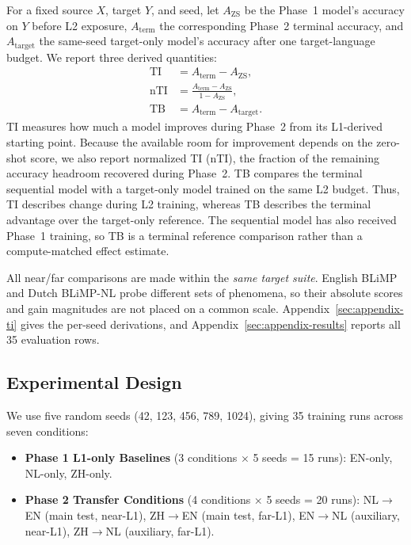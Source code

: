 \documentclass[11pt]{article}
\begin{document}
For a fixed source $X$, target $Y$, and seed, let $A_{\mathrm{ZS}}$ be the Phase~1 model's accuracy on $Y$ before L2 exposure, $A_{\mathrm{term}}$ the corresponding Phase~2 terminal accuracy, and $A_{\mathrm{target}}$ the same-seed target-only model's accuracy after one target-language budget. We report three derived quantities:
\begin{equation}
\begin{aligned}
\mathrm{TI}  &= A_{\mathrm{term}}-A_{\mathrm{ZS}},\\
\mathrm{nTI}&= \frac{A_{\mathrm{term}}-A_{\mathrm{ZS}}}{1-A_{\mathrm{ZS}}},\\
\mathrm{TB} &= A_{\mathrm{term}}-A_{\mathrm{target}}.
\end{aligned}
\label{eq:metrics}
\end{equation}
TI measures how much a model improves during Phase~2 from its L1-derived starting point. Because the available room for improvement depends on the zero-shot score, we also report normalized TI (nTI), the fraction of the remaining accuracy headroom recovered during Phase~2. TB compares the terminal sequential model with a target-only model trained on the same L2 budget. Thus, TI describes change during L2 training, whereas TB describes the terminal advantage over the target-only reference. The sequential model has also received Phase~1 training, so TB is a terminal reference comparison rather than a compute-matched effect estimate.

All near/far comparisons are made within the \emph{same target suite}. English BLiMP and Dutch BLiMP-NL probe different sets of phenomena, so their absolute scores and gain magnitudes are not placed on a common scale. Appendix~\ref{sec:appendix-ti} gives the per-seed derivations, and Appendix~\ref{sec:appendix-results} reports all 35 evaluation rows.

\subsection{Experimental Design}
We use five random seeds (42, 123, 456, 789, 1024), giving 35 training runs across seven conditions:
\begin{itemize}
    \item \textbf{Phase 1 L1-only Baselines} (3 conditions $\times$ 5 seeds = 15 runs):
        EN-only, NL-only, ZH-only.
    \item \textbf{Phase 2 Transfer Conditions} (4 conditions $\times$ 5 seeds = 20 runs):
        NL$\rightarrow$EN (main test, near-L1), ZH$\rightarrow$EN (main test, far-L1),
        EN$\rightarrow$NL (auxiliary, near-L1), ZH$\rightarrow$NL (auxiliary, far-L1).
\end{itemize}
\end{document}
